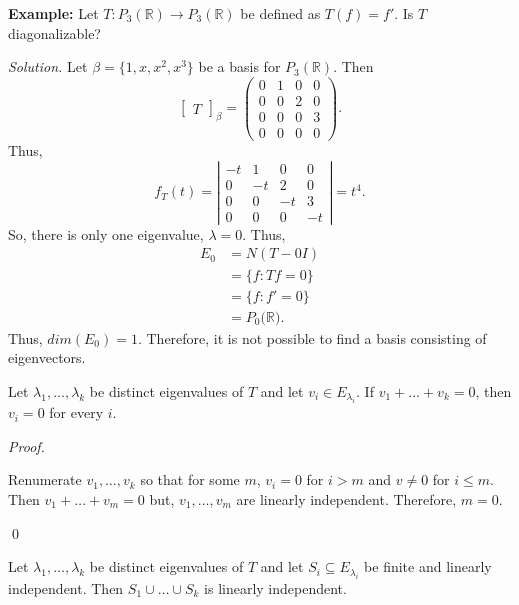 \documentclass[12pt]{article}
\newenvironment{lemma}[2][Lemma]{\begin{trivlist}
\item[\hskip \labelsep {\bfseries #1}\hskip \labelsep {\bfseries #2.}]}{\end{trivlist}}
\newenvironment{theorem}[2][Theorem]{\begin{trivlist}
\item[\hskip \labelsep {\bfseries #1}\hskip \labelsep {\bfseries #2.}]}{\end{trivlist}}
\newenvironment{sol}
    {\emph{Proof.}
    }
    {
    \qed
    }
\begin{document}
\vspace{1em}

\noindent\textbf{Example:} Let $T : P_3(\mathbb{R}) \to P_3(\mathbb{R})$ be defined as $T(f) = f'$. Is $T$ diagonalizable?

\textit{Solution.} Let $\beta = \{1, x, x^2, x^3\}$ be a basis for $P_3(\mathbb{R})$. Then $$\begin{bmatrix}
T
\end{bmatrix}_\beta = \begin{pmatrix}
0 & 1 & 0 & 0 \\ 0 & 0 & 2 & 0 \\ 0 & 0 & 0 & 3 \\ 0 & 0 & 0 & 0
\end{pmatrix}.$$ Thus, $$f_T(t) = \left| \begin{array}{cccc}
     -t & 1 & 0 & 0 \\ 0 & -t & 2 & 0 \\ 0 & 0 & -t & 3 \\ 0 & 0 & 0 & -t
\end{array} \right| = t^4.$$ So, there is only one eigenvalue, $\lambda = 0$.
Thus, \begin{align*}
    E_0 &= N(T - 0I) \\
    &= \{f : Tf = 0\} \\
    &= \{f : f' = 0\} \\
    &= P_0(\mathbb{R)}.
\end{align*} Thus, $dim(E_0) = 1$. Therefore, it is not possible to find a basis consisting of eigenvectors.

\begin{lemma}{9}
Let $\lambda_1, \dots, \lambda_k$ be distinct eigenvalues of $T$ and let $v_i \in E_{\lambda_i}$. If $v_1 + \dots + v_k = 0$, then $v_i = 0$ for every $i$.
\end{lemma}

\begin{sol}
Renumerate $v_1, \dots, v_k$ so that for some $m$, $v_i = 0$ for $i > m$ and $v \neq 0$ for $i \leq m$. Then $v_1 + \dots + v_m = 0$ but, $v_1, \dots, v_m$ are linearly independent. Therefore, $m = 0$.
\end{sol}

\begin{theorem}{5.8}
Let $\lambda_1, \dots, \lambda_k$ be distinct eigenvalues of $T$ and let $S_i \subseteq E_{\lambda_i}$ be finite and linearly independent. Then $S_1 \cup \dots \cup S_k$ is linearly independent.
\end{theorem}
\end{document}
